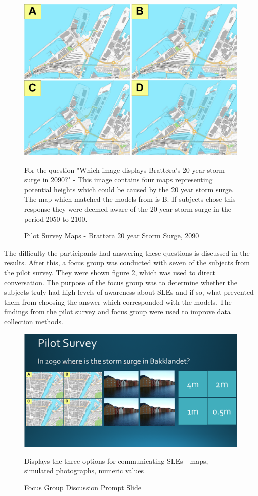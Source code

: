 \begin{figure}[H]
    \centering
    \includegraphics[width=16cm]{fig/brattora question on 2090 20 yr storm surge quadrant.png} 
    \caption{Pilot Survey Maps - Brattøra 20 year Storm Surge, 2090}{For the question "Which image displays Brattøra's 20 year storm surge in 2090?" - This image contains four maps representing potential heights which could be caused by the 20 year storm surge. The map which matched the models from \cite{kartverket_se_2021} is B. If subjects chose this response they were deemed aware of the 20 year storm surge in the period 2050 to 2100. }
    \label{fig:brattora_2090_stormsurge}
\end{figure}



The difficulty the participants had answering these questions is discussed in the results. After this, a focus group was conducted with seven of the subjects from the pilot survey.  They were shown figure \ref{fig:slide}, which was used to direct conversation. The purpose of the focus group was to determine whether the subjects truly had high levels of awareness about SLEs and if so, what prevented them from choosing the answer which corresponded with the models. The findings from the pilot survey and focus group were used to improve data collection methods. 

\begin{figure}[H]
    \centering
    \includegraphics[width=1\textwidth]{fig_results/slide-pilot-survey.png}
    \caption{Focus Group Discussion Prompt Slide} {Displays the three options for communicating SLEs - maps, simulated photographs, numeric values}
    \label{fig:slide}
\end{figure}

